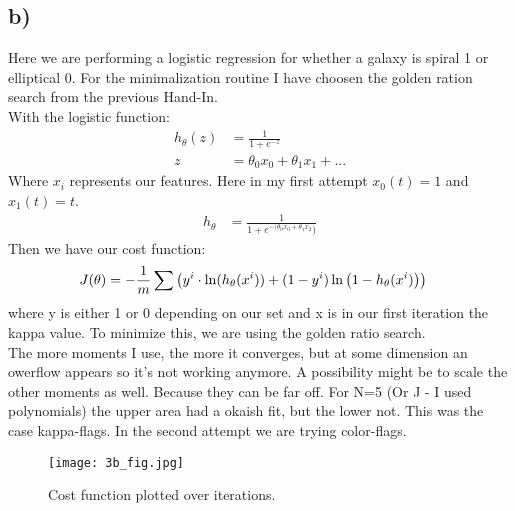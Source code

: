 \subsection{b)}
Here we are performing a logistic regression for whether a galaxy is spiral 1 or elliptical 0. For the minimalization routine I have choosen the golden ration search from the previous Hand-In. \\
With the logistic function: 
\begin{align}
    h_\theta(z) &= \frac{1}{1+e^{-z}}\\
    z &= \theta_0 x_0 + \theta_1 x_1 + ... 
\end{align}
Where $x_i$ represents our features. Here in my first attempt  $x_0(t) = 1$ and $x_{1}(t) = t$. 
\begin{align}
    h_\theta &= \frac{1}{1+e^{-(\theta_0 x_0+ \theta_1 x_2})}
\end{align}
Then we have our cost function: 
\begin{align}
    J(\theta) &= - \frac{1}{m} \sum \left({y^{i}  \cdot \ln(h_\theta (x^{i})) + (1-y^{i})\ln\left({1-h_\theta(x^{i})}\right)}\right)
\end{align}
where y is either 1 or 0 depending on our set and x is in our first iteration the kappa value. To minimize this, we are using the golden ratio search. \\

The more moments I use, the more it converges, but at some dimension an owerflow appears so it's not working anymore. A possibility might be to scale the other moments as well. Because they can be far off. For N=5 (Or J - I used polynomials) the upper area had a okaish fit, but the lower not. This was the case kappa-flags. 
In the second attempt we are trying color-flags.

\begin{figure}[h!]
    \centering
    \texttt{[image: 3b\_fig.jpg]}
    \caption{Cost function plotted over iterations.}
\end{figure}



